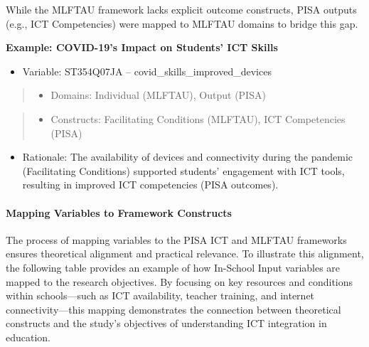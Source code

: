 \documentclass[
]{article}
\providecommand{\tightlist}{%
  \setlength{\itemsep}{0pt}\setlength{\parskip}{0pt}}
\begin{document}
While the MLFTAU framework lacks explicit outcome constructs, PISA
outputs (e.g., ICT Competencies) were mapped to MLFTAU domains to bridge
this gap.

\textbf{Example: COVID-19's Impact on Students' ICT Skills}

\begin{itemize}
\tightlist
\item
  Variable: ST354Q07JA -- covid\_skills\_improved\_devices
\end{itemize}

\begin{quote}
\begin{itemize}
\tightlist
\item
  Domains: Individual (MLFTAU), Output (PISA)
\end{itemize}
\end{quote}

\begin{quote}
\begin{itemize}
\tightlist
\item
  Constructs: Facilitating Conditions (MLFTAU), ICT Competencies (PISA)
\end{itemize}
\end{quote}

\begin{itemize}
\tightlist
\item
  Rationale: The availability of devices and connectivity during the
  pandemic (Facilitating Conditions) supported students' engagement with
  ICT tools, resulting in improved ICT competencies (PISA outcomes).
\end{itemize}

\hypertarget{mapping-variables-to-framework-constructs}{%
\paragraph{Mapping Variables to Framework
Constructs}\label{mapping-variables-to-framework-constructs}}

The process of mapping variables to the PISA ICT and MLFTAU frameworks
ensures theoretical alignment and practical relevance. To illustrate
this alignment, the following table provides an example of how In-School
Input variables are mapped to the research objectives. By focusing on
key resources and conditions within schools---such as ICT availability,
teacher training, and internet connectivity---this mapping demonstrates
the connection between theoretical constructs and the study's objectives
of understanding ICT integration in education.
\end{document}
